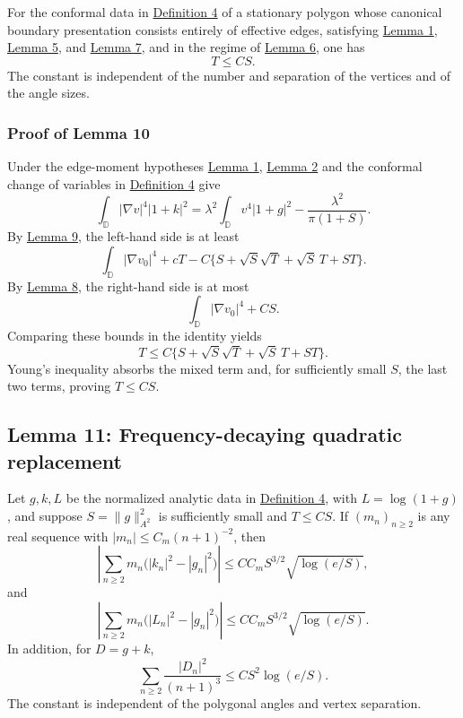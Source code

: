 \documentclass[11pt]{article}
\begin{document}
For the conformal data in \hyperref[def-conformal-data]{Definition 4} of
a stationary polygon whose canonical boundary presentation consists
entirely of effective edges, satisfying
\hyperref[lem-edge-moments]{Lemma 1},
\hyperref[lem-disk-perturbation]{Lemma 5}, and
\hyperref[lem-gradient-perturbation]{Lemma 7}, and in the regime of
\hyperref[lem-near-circle-conformal]{Lemma 6}, one has \[
T\le CS.
\] The constant is independent of the number and separation of the
vertices and of the angle sizes.

\subsubsection{Proof of Lemma 10}\label{proof-lem-inverse-energy}

Under the edge-moment hypotheses \hyperref[lem-edge-moments]{Lemma 1},
\hyperref[lem-airy-identity]{Lemma 2} and the conformal change of
variables in \hyperref[def-conformal-data]{Definition 4} give \[
\int_{\mathbb D}|\nabla v|^4|1+k|^2
=\lambda^2\int_{\mathbb D}v^4|1+g|^2-\frac{\lambda^2}{\pi(1+S)}.
\] By \hyperref[lem-inverse-left-bound]{Lemma 9}, the left-hand side is
at least \[
\int_{\mathbb D}|\nabla v_0|^4+cT-C\{S+\sqrt S\sqrt T+\sqrt S\,T+ST\}.
\] By \hyperref[lem-weighted-eigen-balance]{Lemma 8}, the right-hand
side is at most \[
\int_{\mathbb D}|\nabla v_0|^4+CS.
\] Comparing these bounds in the identity yields \[
T\le C\{S+\sqrt S\sqrt T+\sqrt S\,T+ST\}.
\] Young's inequality absorbs the mixed term and, for sufficiently small
\(S\), the last two terms, proving \(T\le CS\).

\subsection{Lemma 11: Frequency-decaying quadratic
replacement}\label{lem-frequency-replacement}

Let \(g,k,L\) be the normalized analytic data in
\hyperref[def-conformal-data]{Definition 4}, with \(L=\log(1+g)\), and
suppose \(S=\|g\|_{A^2}^2\) is sufficiently small and \(T\le CS\). If
\((m_n)_{n\ge2}\) is any real sequence with \(|m_n|\le C_m(n+1)^{-2}\),
then \[
\left|\sum_{n\ge2}m_n\bigl(|k_n|^2-|g_n|^2\bigr)\right|
\le C C_m S^{3/2}\sqrt{\log(e/S)},
\] and \[
\left|\sum_{n\ge2}m_n\bigl(|L_n|^2-|g_n|^2\bigr)\right|
\le C C_m S^{3/2}\sqrt{\log(e/S)}.
\] In addition, for \(D=g+k\), \[
\sum_{n\ge2}\frac{|D_n|^2}{(n+1)^3}
\le CS^2\log(e/S).
\] The constant is independent of the polygonal angles and vertex
separation.
\end{document}
